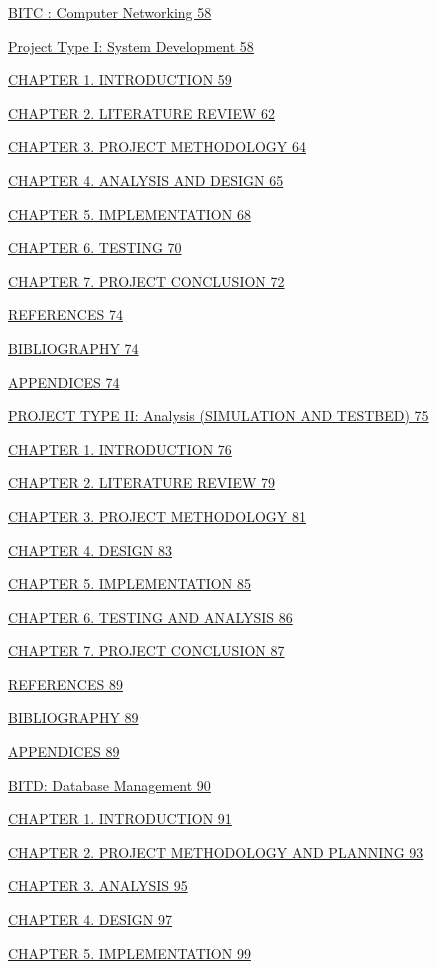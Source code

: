 \hyperref[_bookmark12]{BITC : Computer Networking 58}

\hyperref[_bookmark13]{Project Type I: System Development 58}

\hyperref[_bookmark14]{CHAPTER 1. INTRODUCTION 59}

\hyperref[_bookmark15]{CHAPTER 2. LITERATURE REVIEW 62}

\hyperref[_bookmark16]{CHAPTER 3. PROJECT METHODOLOGY 64}

\hyperref[_bookmark17]{CHAPTER 4. ANALYSIS AND DESIGN 65}

\hyperref[_bookmark18]{CHAPTER 5. IMPLEMENTATION 68}

\hyperref[_bookmark19]{CHAPTER 6. TESTING 70}

\hyperref[_bookmark20]{CHAPTER 7. PROJECT CONCLUSION 72}

\hyperref[_bookmark21]{REFERENCES 74}

\hyperref[_bookmark22]{BIBLIOGRAPHY 74}

\hyperref[_bookmark23]{APPENDICES 74}

\hyperref[_bookmark24]{PROJECT TYPE II: Analysis (SIMULATION AND
TESTBED) 75}

\hyperref[_bookmark25]{CHAPTER 1. INTRODUCTION 76}

\hyperref[_bookmark26]{CHAPTER 2. LITERATURE REVIEW 79}

\hyperref[_bookmark27]{CHAPTER 3. PROJECT METHODOLOGY 81}

\hyperref[_bookmark28]{CHAPTER 4. DESIGN 83}

\hyperref[_bookmark29]{CHAPTER 5. IMPLEMENTATION 85}

\hyperref[_bookmark30]{CHAPTER 6. TESTING AND ANALYSIS 86}

\hyperref[_bookmark31]{CHAPTER 7. PROJECT CONCLUSION 87}

\hyperref[_bookmark32]{REFERENCES 89}

\hyperref[_bookmark33]{BIBLIOGRAPHY 89}

\hyperref[_bookmark34]{APPENDICES 89}

\hyperref[_bookmark35]{BITD: Database Management 90}

\hyperref[_bookmark36]{CHAPTER 1. INTRODUCTION 91}

\hyperref[_bookmark37]{CHAPTER 2. PROJECT METHODOLOGY AND PLANNING 93}

\hyperref[_bookmark38]{CHAPTER 3. ANALYSIS 95}

\hyperref[_bookmark39]{CHAPTER 4. DESIGN 97}

\hyperref[_bookmark40]{CHAPTER 5. IMPLEMENTATION 99}

